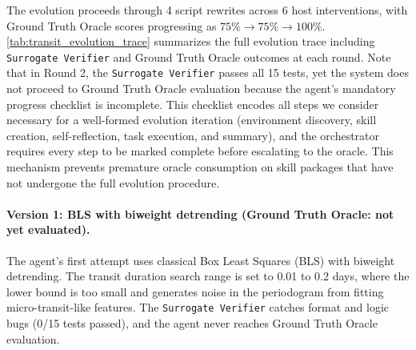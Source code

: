 \documentclass{article}
\begin{document}
The evolution proceeds through 4 script rewrites across 6 host interventions, with Ground Truth Oracle scores progressing as $75\% \rightarrow 75\% \rightarrow 100\%$. \autoref{tab:transit_evolution_trace} summarizes the full evolution trace including \texttt{Surrogate Verifier} and Ground Truth Oracle outcomes at each round. Note that in Round 2, the \texttt{Surrogate Verifier} passes all 15 tests, yet the system does not proceed to Ground Truth Oracle evaluation because the agent's mandatory progress checklist is incomplete. This checklist encodes all steps we consider necessary for a well-formed evolution iteration (environment discovery, skill creation, self-reflection, task execution, and summary), and the orchestrator requires every step to be marked complete before escalating to the oracle. This mechanism prevents premature oracle consumption on skill packages that have not undergone the full evolution procedure.

\begin{table}[ht!]
\centering
\caption{Evolution trace for the exoplanet transit detection skill. Each round records the trigger type, \texttt{Surrogate Verifier} outcome, Ground Truth Oracle outcome, and key event.}
\label{tab:transit_evolution_trace}
\footnotesize
{}
\end{table}

\paragraph{Version 1: BLS with biweight detrending (Ground Truth Oracle: not yet evaluated).}
The agent's first attempt uses classical Box Least Squares (BLS) with biweight detrending. The transit duration search range is set to 0.01 to 0.2 days, where the lower bound is too small and generates noise in the periodogram from fitting micro-transit-like features. The \texttt{Surrogate Verifier} catches format and logic bugs (0/15 tests passed), and the agent never reaches Ground Truth Oracle evaluation.
\end{document}
